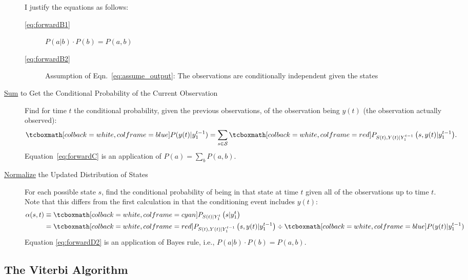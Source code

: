 \documentclass[]{article}
\newcommand{\ti}[2]{{#1}{(#2)}}                  %
\newcommand{\states}{{\cal S}}
\newcommand{\ie}{i.e.\xspace}
\begin{document}
\begin{description}
I justify the equations as follows:
\begin{description}
\item[\eqref{eq:forwardB1}]  $P(a|b)\cdot P(b) = P(a,b)$
\item[\eqref{eq:forwardB2}] Assumption of
  Eqn.~\eqref{eq:assume_output}: The observations are conditionally
  independent given the states
\end{description}
\item[\underline{Sum} to Get the Conditional Probability of the Current Observation]
  Find for time $t$ the conditional probability, given the previous
  observations, of the observation being $\ti{y}{t}$ (the observation actually
  observed):
  \begin{align}
    \label{eq:forwardC}
    \gammax &= \sum_{s \in \states} \pregamma .
  \end{align}
Equation~\eqref{eq:forwardC} is an application of $P(a) = \sum_b P(a,b)$.
\item[\underline{Normalize} the Updated Distribution of States] For each possible
  state $s$, find the conditional probability of being in that state
  at time $t$ given all of the observations up to time $t$.  Note that
  this differs from the first calculation in that the
  conditioning event includes $\ti{y}{t}$:%
  \begin{subequations}
    \label{eq:forwardD}
    \begin{align}
      \label{eq:forwardD1}
      \alpha(s,t) &\equiv
      \alphax{t}{s} \\
      \label{eq:forwardD2}
      &= \pregamma \div \gammax
    \end{align}
  \end{subequations}
  Equation \eqref{eq:forwardD2} is an application of Bayes rule, \ie,
  $P(a|b)\cdot P(b) = P(a,b)$.
\end{description}

\subsection{The Viterbi Algorithm}
\label{sec:viterbi}
\end{document}
